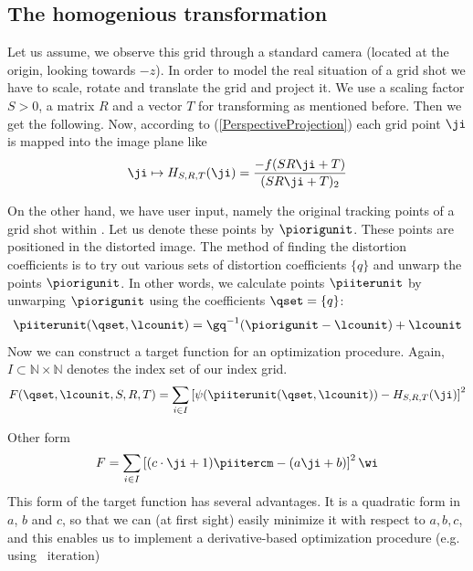 \subsection{The homogenious transformation}
Let us assume, we observe this grid through a standard camera (located at the origin, looking towards $-z$).
In order to model the real situation of a grid shot we have to scale, rotate and translate the grid and project it.
We use a scaling factor $S > 0$, a matrix $R$ and a vector $T$ for transforming as mentioned before.
Then we get the following. Now, according to (\ref{PerspectiveProjection}) each grid point $\ji$ is mapped into the image plane like
\begin{equation}
\ji \mapsto H_{S,R,T}(\ji) = \frac {-f(SR\ji + T)}{(SR\ji + T)_2}
\end{equation}

On the other hand, we have user input, namely the original tracking points of a grid shot within \tde.
Let us denote these points by $\piorigunit$. These points are positioned in the distorted image.
The method of finding the distortion coefficients is to try out various sets of distortion
coefficients $\{q\}$ and unwarp the points $\piorigunit$. In other words, we calculate
points $\piiterunit$ by unwarping $\piorigunit$ using the coefficients $\qset = \{q\}$:
\begin{equation}
\piiterunit(\qset,\lcounit) = \gq^{-1}(\piorigunit - \lcounit) + \lcounit
\end{equation}
Now we can construct a target function for an optimization procedure.
Again, $I\subset\mathbb{N}\times\mathbb{N}$ denotes the index set of our index grid.
\begin{equation}
F(\qset,\lcounit,S,R,T) = \sum_{i\in I}\left[\psi(\piiterunit(\qset,\lcounit)) - H_{S,R,T}(\ji)\right]^2
\end{equation}

Other form
\begin{equation}
F = \sum_{i\in I}\left[(c\cdot\ji+1)\piitercm - (a\ji+b)\right]^2 \wi
\end{equation}
This form of the target function has several advantages.
It is a quadratic form in $a$, $b$ and $c$, so that we can (at first sight)
easily minimize it with respect to $a,b,c$, and this enables us to implement
a derivative-based optimization procedure (e.g. using \Newton\ iteration)
